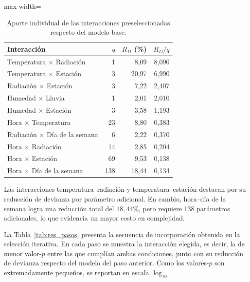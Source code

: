 \documentclass[12pt, a4paper]{article}
\numberwithin{equation}{section}
\begin{document}
\begin{table}[htbp]
\centering\small
\caption{Aporte individual de las interacciones preseleccionadas respecto del modelo base.}
\label{tab:res_candidatas}
\begin{adjustbox}{max width=\linewidth}
\begin{tabular}{lrrr}\toprule
Interacción & $q$ & $R_D$ (\%) & $R_D/q$ \\\midrule
Temperatura $\times$ Radiación & 1 & 8{,}09 & 8{,}090 \\
Temperatura $\times$ Estación & 3 & 20{,}97 & 6{,}990 \\
Radiación $\times$ Estación & 3 & 7{,}22 & 2{,}407 \\
Humedad $\times$ Lluvia & 1 & 2{,}01 & 2{,}010 \\
Humedad $\times$ Estación & 3 & 3{,}58 & 1{,}193 \\
Hora $\times$ Temperatura & 23 & 8{,}80 & 0{,}383 \\
Radiación $\times$ Día de la semana & 6 & 2{,}22 & 0{,}370 \\
Hora $\times$ Radiación & 14 & 2{,}85 & 0{,}204 \\
Hora $\times$ Estación & 69 & 9{,}53 & 0{,}138 \\
Hora $\times$ Día de la semana & 138 & 18{,}44 & 0{,}134 \\\bottomrule
\end{tabular}
\end{adjustbox}
\end{table}

Las interacciones temperatura--radiación y temperatura--estación destacan por su reducción de devianza por parámetro adicional. En cambio, hora--día de la semana logra una reducción total del $18{,}44\%$, pero requiere 138 parámetros adicionales, lo que evidencia un mayor costo en complejidad.

La Tabla~\ref{tab:res_pasos} presenta la secuencia de incorporación obtenida en la selección iterativa. En cada paso se muestra la interacción elegida, es decir, la de menor valor-$p$ entre las que cumplían ambas condiciones, junto con su reducción de devianza respecto del modelo del paso anterior. Como los valores-$p$ son extremadamente pequeños, se reportan en escala $\log_{10}$.
\end{document}
